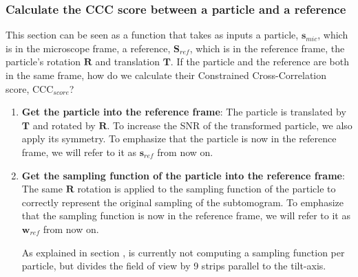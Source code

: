 \subsubsection{Calculate the CCC score between a particle and a reference} \label{sec:algo:align:get_CCC}

This section can be seen as a function that takes as inputs a particle, $\bm{s}_{mic}$, which is in the microscope frame, a reference, $\bm{S}_{ref}$, which is in the reference frame, the particle's rotation $\bm{R}$ and translation $\bm{T}$. If the particle and the reference are both in the same frame, how do we calculate their Constrained Cross-Correlation score, $\bm{\mathrm{CCC}}_{score}$?

\begin{enumerate}
    \item \textbf{Get the particle into the reference frame}: The particle is translated by $\bm{T}$ and rotated by $\bm{R}$. To increase the SNR of the transformed particle, we also apply its symmetry. To emphasize that the particle is now in the reference frame, we will refer to it as $\bm{s}_{ref}$ from now on.

    \item \textbf{Get the sampling function of the particle into the reference frame}: The same $\bm{R}$ rotation is applied to the sampling function of the particle to correctly represent the original sampling of the subtomogram. To emphasize that the sampling function is now in the reference frame, we will refer to it as $\bm{w}_{ref}$ from now on.
    \begin{note}As explained in section , {\emClarity} is currently not computing a sampling function per particle, but divides the field of view by 9 strips parallel to the tilt-axis.
    \end{note}


\end{enumerate}
